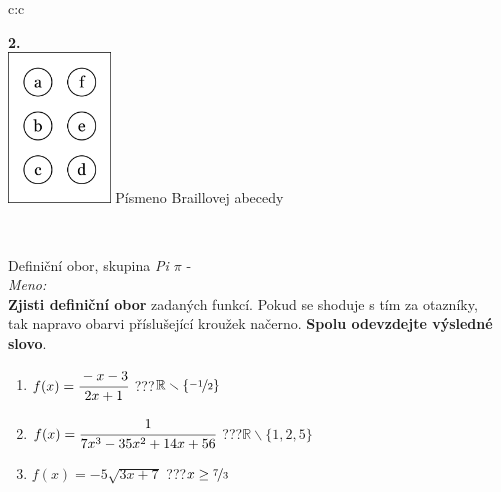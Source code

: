 \documentclass[10pt]{report}
\begin{document}
\begin{tabular}{c:c}
\begin{minipage}[c][99mm][t]{0.49\linewidth}
\begin{center}
\begin{minipage}{0.77\linewidth}
\begin{center}
\begin{varwidth}{\textwidth}
\begin{enumerate}
\end{enumerate}
\end{varwidth}
\end{center}
\end{minipage}
\begin{minipage}{0.20\linewidth}
\begin{center}
{\Huge\bfseries 2.} \\[2mm]
\includegraphics[height=40mm]{../images/braille.png}
{\small Písmeno Braillovej abecedy}
\end{center}
\end{minipage}
\end{center}
\end{minipage}
\\ \hdashline
\begin{minipage}[c][99mm][t]{0.49\linewidth}
\begin{center}
\vspace{7mm}
{\huge Definiční obor, skupina \textit{Pi $\pi$} -}\\[4.5mm]
\textit{Meno:}\phantom{xxxxxxxxxxxxxxxxxxxxxxxxxxxxxxxxxxxxxxxxxxxxxxxxxxxxxxxxxxxxxxxxx}\\[3.5mm]
\textbf{Zjisti definiční obor} zadaných funkcí. Pokud se shoduje s tím za otazníky,\\tak napravo obarvi příslušející kroužek načerno. \textbf{Spolu odevzdejte výsledné slovo}.\\[3mm]
\begin{minipage}{0.77\linewidth}
\begin{center}
\begin{varwidth}{\textwidth}
\begin{enumerate}
\normalsize
\item $f(x)=\cfrac{-x-3}{2x+1}$\quad \dotfill\; ???\;\dotfill \quad $\mathbb{R}\smallsetminus\{\nicefrac{-1}{2}\}$
\item $f(x)=\cfrac{1}{7x^3-35x^2+14x+56}$\quad \dotfill\; ???\;\dotfill \quad $\mathbb{R}\smallsetminus\{1,2,5\}$
\item $f(x)=-5\sqrt{3x+7}$\quad \dotfill\; ???\;\dotfill \quad $x\geq\nicefrac{7}{3}$

\end{enumerate}
\end{varwidth}
\end{center}
\end{minipage}
\end{center}
\end{minipage}
\end{tabular}
\end{document}
